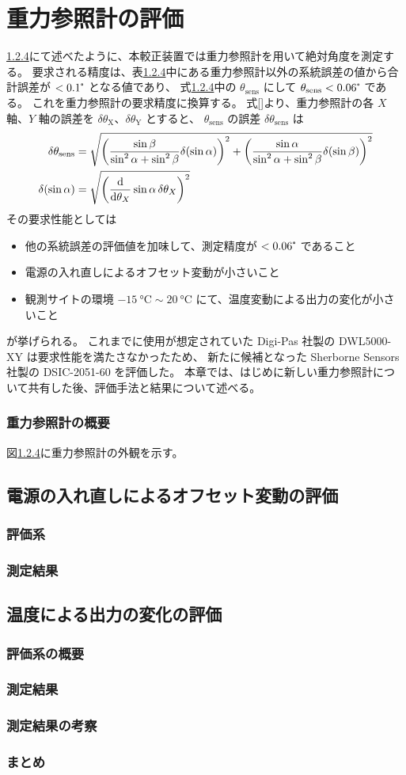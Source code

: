 \documentclass[../../main.tex]{subfiles}
\begin{document}
\chapter{重力参照計の評価}
\ref{}にて述べたように、本較正装置では重力参照計を用いて絶対角度を測定する。
要求される精度は、表\ref{}中にある重力参照計以外の系統誤差の値から合計誤差が $<0.1\tcdegree$ となる値であり、
式\ref{}中の $\theta_{\mathrm{sens}}$ にして $\theta_{\mathrm{sens}}<0.06\tcdegree$ である。
これを重力参照計の要求精度に換算する。
式\eqref{}より、重力参照計の各 $X$ 軸、$Y$ 軸の誤差を $\delta\theta_{\mathrm{X}}$、$\delta\theta_{\mathrm{Y}}$ とすると、
$\theta_{\mathrm{sens}}$ の誤差 $\delta\theta_{\mathrm{sens}}$ は
\begin{align}
    \delta\theta_{\mathrm{sens}} &= 
        \sqrt{\qty(\dfrac{\sin\beta}{\sin^2\alpha+\sin^2\beta} \delta\qty(\sin\alpha))^2 + \qty(\dfrac{\sin\alpha}{\sin^2\alpha+\sin^2\beta} \delta\qty(\sin\beta))^2}\\ 
    \delta\qty(\sin\alpha) &= \sqrt{\qty(\dv{\theta_X}\sin\alpha\,\delta\theta_X)^2}
    \
\end{align}
その要求性能としては
\begin{itemize}
    \item 他の系統誤差の評価値を加味して、測定精度が $<0.06\tcdegree$ であること
    \item 電源の入れ直しによるオフセット変動が小さいこと
    \item 観測サイトの環境 $\SI{-15}{\degreeCelsius} \sim \SI{20}{\degreeCelsius}$ にて、温度変動による出力の変化が小さいこと
\end{itemize}
が挙げられる。
これまでに使用が想定されていた Digi-Pas 社製の DWL5000-XY は要求性能を満たさなかったため、
新たに候補となった Sherborne Sensors 社製の DSIC-2051-60 を評価した。
本章では、はじめに新しい重力参照計について共有した後、評価手法と結果について述べる。
\subsection{重力参照計の概要}
図\ref{}に重力参照計の外観を示す。
\section{電源の入れ直しによるオフセット変動の評価}
\subsection{評価系}
\subsection{測定結果}
\section{温度による出力の変化の評価}
\subsection{評価系の概要}
\subsection{測定結果}
\subsection{測定結果の考察}
\subsection{まとめ}
\end{document}
